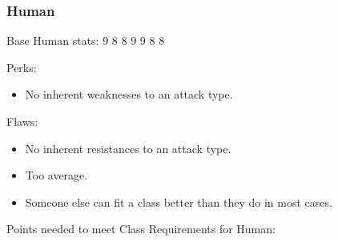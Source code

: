 \documentclass[12pt]{article}
\providecommand{\tightlist}{%
  \setlength{\itemsep}{0pt}\setlength{\parskip}{0pt}}
\newcommand{\WviiTwoColumnSetup}{\raggedcolumns\RaggedRight}
\begin{document}
\subsubsection{Human}\label{human}

Base Human stats: 9 8 8 9 9 8 8

\begin{multicols}{2}\WviiTwoColumnSetup
Perks:

\begin{itemize}
\tightlist
\item
  No inherent weaknesses to an attack type.
\end{itemize}
\columnbreak

Flaws:

\begin{itemize}
\tightlist
\item
  No inherent resistances to an attack type.
\item
  Too average.
\item
  Someone else can fit a class better than they do in most cases.
\end{itemize}
\end{multicols}

Points needed to meet Class Requirements for Human:
\end{document}
